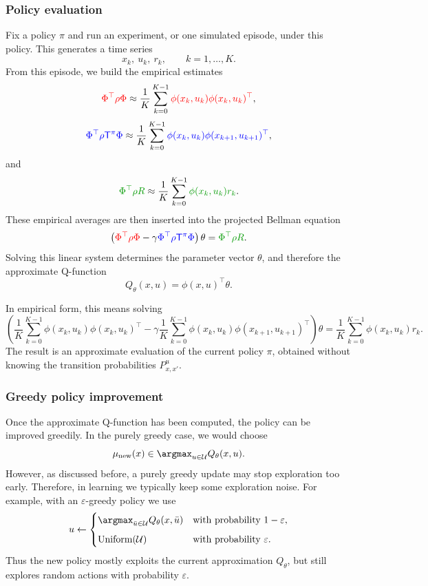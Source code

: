 \subsubsection{Policy evaluation}

Fix a policy \(\pi\) and run an experiment, or one simulated episode, under this policy. This
generates a time series
\[
x_k,\ u_k,\ r_k,
\qquad
k=1,\dots,K.
\]
From this episode, we build the empirical estimates
\[
\textcolor{red}{\Phi^\top\rho\Phi}
\approx
\frac{1}{K}\sum_{k=0}^{K-1}
\textcolor{red}{\phi(x_k,u_k)\phi(x_k,u_k)^\top},
\]
\[
\textcolor{blue}{\Phi^\top\rho\mathsf{T}^{\pi}\Phi}
\approx
\frac{1}{K}\sum_{k=0}^{K-1}
\textcolor{blue}{\phi(x_k,u_k)\phi(x_{k+1},u_{k+1})^\top},
\]
and
\[
\textcolor{green!60!black}{\Phi^\top\rho R}
\approx
\frac{1}{K}\sum_{k=0}^{K-1}
\textcolor{green!60!black}{\phi(x_k,u_k)r_k}.
\]
These empirical averages are then inserted into the projected Bellman equation
\[
\left(
\textcolor{red}{\Phi^\top\rho\Phi}
-
\gamma
\textcolor{blue}{\Phi^\top\rho\mathsf{T}^{\pi}\Phi}
\right)\theta
=
\textcolor{green!60!black}{\Phi^\top\rho R}.
\]
Solving this linear system determines the parameter vector \(\theta\), and therefore the
approximate Q-function
\[
Q_\theta(x,u)=\phi(x,u)^\top\theta.
\]

In empirical form, this means solving
\[
\left(
\frac{1}{K}\sum_{k=0}^{K-1}\phi(x_k,u_k)\phi(x_k,u_k)^\top
-
\gamma
\frac{1}{K}\sum_{k=0}^{K-1}\phi(x_k,u_k)\phi(x_{k+1},u_{k+1})^\top
\right)\theta
=
\frac{1}{K}\sum_{k=0}^{K-1}\phi(x_k,u_k)r_k.
\]
The result is an approximate evaluation of the current policy \(\pi\), obtained without knowing
the transition probabilities \(P^u_{x,x'}\).

\subsubsection{Greedy policy improvement}

Once the approximate Q-function has been computed, the policy can be improved greedily. In
the purely greedy case, we would choose
\[
\mu_{\mathrm{new}}(x)
\in
\argmax_{u\in\cU}Q_\theta(x,u).
\]
However, as discussed before, a purely greedy update may stop exploration too early. Therefore,
in learning we typically keep some exploration noise. For example, with an \(\varepsilon\)-greedy
policy we use
\[
u
\leftarrow
\begin{cases}
\displaystyle \argmax_{\bar u\in\cU}Q_\theta(x,\bar u)
&
\text{with probability }1-\varepsilon,\\[2mm]
\text{Uniform}(\cU)
&
\text{with probability }\varepsilon.
\end{cases}
\]
Thus the new policy mostly exploits the current approximation \(Q_\theta\), but still explores
random actions with probability \(\varepsilon\).


